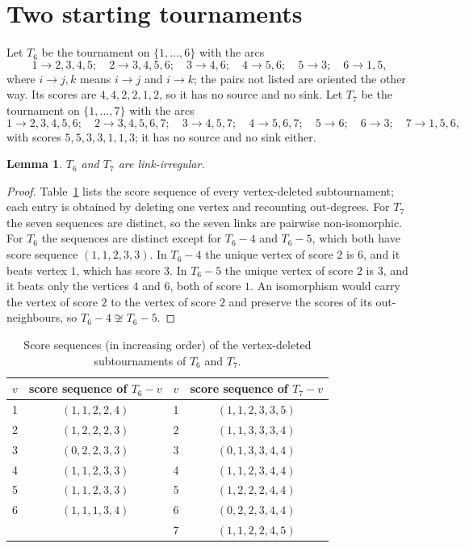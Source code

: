 \documentclass[11pt]{amsart}
\newtheorem{lemma}[theorem]{Lemma}
\theoremstyle{definition}
\theoremstyle{remark}
\numberwithin{equation}{section}
\begin{document}
\section{Two starting tournaments}\label{sec:base}

Let $T_6$ be the tournament on $\{1,\dots,6\}$ with the arcs
\[
1\to2,3,4,5;\quad 2\to3,4,5,6;\quad 3\to4,6;\quad 4\to5,6;\quad 5\to3;\quad 6\to1,5,
\]
where $i\to j,k$ means $i\to j$ and $i\to k$; the pairs not listed are oriented the other way. Its scores are $4,4,2,2,1,2$, so it has no source and no sink. Let $T_7$ be the tournament on $\{1,\dots,7\}$ with the arcs
\[
1\to2,3,4,5,6;\quad 2\to3,4,5,6,7;\quad 3\to4,5,7;\quad 4\to5,6,7;\quad 5\to6;\quad 6\to3;\quad 7\to1,5,6,
\]
with scores $5,5,3,3,1,1,3$; it has no source and no sink either.

\begin{lemma}\label{lem:base}
$T_6$ and $T_7$ are link-irregular.
\end{lemma}

\begin{proof}
Table~\ref{tab:base} lists the score sequence of every vertex-deleted subtournament; each entry is obtained by deleting one vertex and recounting out-degrees. For $T_7$ the seven sequences are distinct, so the seven links are pairwise non-isomorphic. For $T_6$ the sequences are distinct except for $T_6-4$ and $T_6-5$, which both have score sequence $(1,1,2,3,3)$. In $T_6-4$ the unique vertex of score $2$ is $6$, and it beats vertex $1$, which has score $3$. In $T_6-5$ the unique vertex of score $2$ is $3$, and it beats only the vertices $4$ and $6$, both of score $1$. An isomorphism would carry the vertex of score $2$ to the vertex of score $2$ and preserve the scores of its out-neighbours, so $T_6-4\not\cong T_6-5$.
\end{proof}

\begin{table}[ht]
\centering
\caption{Score sequences (in increasing order) of the vertex-deleted subtournaments of $T_6$ and $T_7$.}
\label{tab:base}
\begin{tabular}{c c @{\qquad\qquad} c c}
\toprule
$v$ & score sequence of $T_6-v$ & $v$ & score sequence of $T_7-v$\\
\midrule
1 & $(1,1,2,2,4)$ & 1 & $(1,1,2,3,3,5)$\\
2 & $(1,2,2,2,3)$ & 2 & $(1,1,3,3,3,4)$\\
3 & $(0,2,2,3,3)$ & 3 & $(0,1,3,3,4,4)$\\
4 & $(1,1,2,3,3)$ & 4 & $(1,1,2,3,4,4)$\\
5 & $(1,1,2,3,3)$ & 5 & $(1,2,2,2,4,4)$\\
6 & $(1,1,1,3,4)$ & 6 & $(0,2,2,3,4,4)$\\
  &                & 7 & $(1,1,2,2,4,5)$\\
\bottomrule
\end{tabular}
\end{table}
\end{document}
